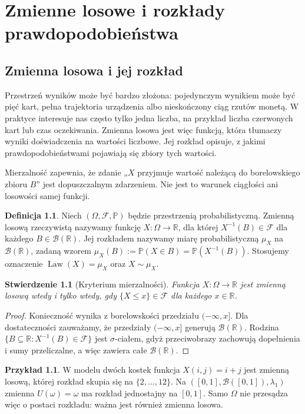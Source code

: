 \documentclass[11pt,a4paper,oneside]{report}
\numberwithin{equation}{chapter}
\theoremstyle{plain}
\newtheorem{stwierdzenie}[twierdzenie]{Stwierdzenie}
\theoremstyle{definition}
\newtheorem{definicja}{Definicja}[chapter]
\newtheorem{przyklad}{Przykład}[chapter]
\theoremstyle{remark}
\newcommand{\R}{\mathbb{R}}
\newcommand{\Prob}{\mathbb{P}}
\newcommand{\Law}{\operatorname{Law}}
\begin{document}
\chapter{Zmienne losowe i rozkłady prawdopodobieństwa}
\label{ch:random-variables}

\section{Zmienna losowa i jej rozkład}
Przestrzeń wyników może być bardzo złożona: pojedynczym wynikiem
może być pięć kart, pełna trajektoria urządzenia albo nieskończony
ciąg rzutów monetą. W praktyce interesuje nas często tylko jedna
liczba, na przykład liczba czerwonych kart lub czas oczekiwania.
Zmienna losowa jest więc funkcją, która tłumaczy wyniki doświadczenia
na wartości liczbowe. Jej rozkład opisuje, z jakimi
prawdopodobieństwami pojawiają się zbiory tych wartości.

Mierzalność zapewnia, że zdanie „$X$ przyjmuje wartość należącą
do borelowskiego zbioru $B$” jest dopuszczalnym zdarzeniem.
Nie jest to warunek ciągłości ani losowości samej funkcji.

\begin{definicja}
Niech $(\Omega,\mathcal F,\Prob)$ będzie przestrzenią probabilistyczną.
Zmienną losową rzeczywistą nazywamy funkcję
$X:\Omega\to\R$, dla której $X^{-1}(B)\in\mathcal F$
dla każdego $B\in\mathcal B(\R)$. Jej rozkładem nazywamy miarę
probabilistyczną $\mu_X$ na $\mathcal B(\R)$, zadaną wzorem
$\mu_X(B):=\Prob(X\in B)=\Prob(X^{-1}(B))$.
Stosujemy oznaczenie $\Law(X)=\mu_X$ oraz $X\sim\mu_X$.
\end{definicja}

\begin{stwierdzenie}[Kryterium mierzalności]
Funkcja $X:\Omega\to\R$ jest zmienną losową wtedy i tylko wtedy,
gdy $\{X\leq x\}\in\mathcal F$ dla każdego $x\in\R$.
\end{stwierdzenie}
\begin{proof}
Konieczność wynika z borelowskości przedziału $(-\infty,x]$.
Dla dostateczności zauważamy, że przedziały $(-\infty,x]$ generują
$\mathcal B(\R)$. Rodzina $\{B\subseteq\R:X^{-1}(B)\in\mathcal F\}$
jest $\sigma$-ciałem, gdyż przeciwobrazy zachowują dopełnienia
i sumy przeliczalne, a więc zawiera całe $\mathcal B(\R)$.
\end{proof}

\begin{przyklad}
W modelu dwóch kostek funkcja $X(i,j)=i+j$ jest zmienną losową,
której rozkład skupia się na $\{2,\ldots,12\}$.
Na $([0,1],\mathcal B([0,1]),\lambda_1)$ zmienna $U(\omega)=\omega$
ma rozkład jednostajny na $[0,1]$. Samo $\Omega$ nie przesądza więc
o postaci rozkładu: ważna jest również zmienna losowa.
\end{przyklad}
\end{document}
